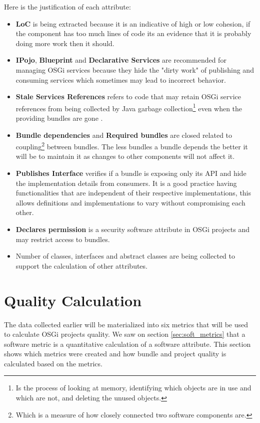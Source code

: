 Here is the justification of each attribute:
\begin{itemize}
\item \textbf{LoC} is being extracted because it is an indicative of high or low cohesion, if the component has too much lines of code its an evidence that it is probably doing more work then it should. 
\item \textbf{IPojo}, \textbf{Blueprint} and \textbf{Declarative Services} are recommended for managing OSGi services because they hide the "dirty work" of publishing and consuming services which sometimes may lead to incorrect behavior. 
\item \textbf{Stale Services References} refers to code that may retain OSGi service references from being collected by Java garbage collection\footnote{Is the process of looking at memory, identifying which objects are in use and which are not, and deleting the unused objects.} even when the providing bundles are gone \citep{Gama 2012}. 
\item \textbf{Bundle dependencies} and \textbf{Required bundles} are closed related to coupling\footnote{Which is a measure of how closely connected two software components are.} between bundles. The less bundles a bundle depends the better it will be to maintain it as changes to other components will not affect it. 
\item \textbf{Publishes Interface} verifies if a bundle is exposing only its API and hide the implementation details from consumers. It is a good practice having functionalities that are independent of their respective implementations, this allows definitions and implementations to vary without compromising each other. 
\item \textbf{Declares permission} is a security software attribute in OSGi projects and may restrict access to bundles. 
\item Number of classes, interfaces and abstract classes are being collected to support the calculation of other attributes. 
\end{itemize}

\section{Quality Calculation}
The data collected earlier will be materialized into six metrics that will be used to calculate OSGi projects quality. We saw on section \ref{sec:soft_metrics} that a software metric is a quantitative calculation of a software attribute. This section shows which metrics were created and how bundle and project quality is calculated based on the metrics.


